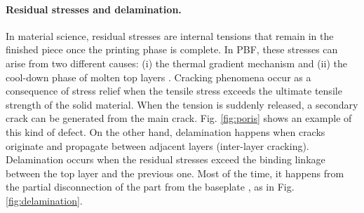 \paragraph{Residual stresses and delamination.} In material science, residual stresses are internal tensions that remain in the finished piece once the printing phase is complete. In PBF, these stresses can arise from two different causes: (i) the thermal gradient mechanism and (ii) the cool-down phase of molten top layers \cite{mercelis_residual_2006}. Cracking phenomena occur as a consequence of stress relief when the tensile stress exceeds the ultimate tensile strength of the solid material. When the tension is suddenly released, a secondary crack can be generated from the main crack. Fig. \ref{fig:poris} shows an example of this kind of defect. On the other hand, delamination happens when cracks originate and propagate between adjacent layers (inter-layer cracking). Delamination occurs when the residual stresses exceed the binding linkage between the top layer and the previous one. Most of the time, it happens from the partial disconnection of the part from the baseplate \cite{sames_metallurgy_2016}, as in Fig. \ref{fig:delamination}.
